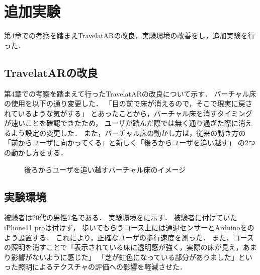 \chapter{追加実験}

第4章での考察を踏まえTravelatARの改良，実験環境の改善をし，追加実験を行った．

\section{TravelatARの改良}
第4章での考察を踏まえて行ったTravelatARの改良について示す．
バーチャル床の使用を以下の通り変更した．
「目の前で床が消えるので，そこで現実に戻されているような気がする」
とあったことから，バーチャル床を消すタイミングが速いことを確認できたため，
ユーザが踏んだ際では無く通り過ぎた際に消えるよう設定の変更した．
また，バーチャル床の動かし方は，従来の動き方の「前からユーザに向かってくる」と新しく「後ろからユーザを追い越す」
の2つの動かし方をする．
\begin{figure}[H]
    \centering
    \caption{後ろからユーザを追い越すバーチャル床のイメージ}
    \label{fig:14}
\end{figure}

\section{実験環境}
被験者は20代の男性7名である．
実験環境をに示す．
被験者に付けていたiPhone11 proは付けず，
歩いてもらうコース上には通過センサーとArduinoをのよう設置する\cite{tuka}．
これにより，正確なユーザの歩行速度を測った．
また，コースの照明を消すことで「表示されている床に透明感が強く，実際の床が見え，あまり影響がないように感じた」
「芝が虹色になっている部分がありました」といった照明によるテクスチャの評価への影響を軽減させた．

